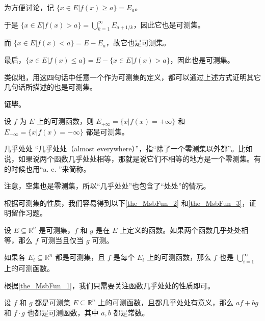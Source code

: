 为方便讨论，记 $\{x\in E|f(x)\geq a\}=E_a$。

于是 $\{x\in E|f(x)>a\}=\bigcup_{k=1}^\infty E_{a+1/k}$，因此它也是可测集。

而 $\{x\in E|f(x)<a\}=E-E_a$，故它也是可测集。

最后，$\{x\in E|f(x)\leq a\}=E-\{x\in E|f(x)>a\}$，因此也是可测集。

类似地，用这四句话中任意一个作为可测集的定义，都可以通过上述方式证明其它几句话所描述的也是可测集。

\textbf{证毕}。





\begin{corollary}{}
设 $f$ 为 $E$ 上的可测函数，则 $E_{+\infty}=\{x|f(x)=+\infty\}$ 和 $E_{-\infty}=\{x|f(x)=-\infty\}$ 都是可测集。
\end{corollary}



\begin{definition}{几乎处处}
“几乎处处（almost everywhere）”，指“除了一个零测集以外都”。比如说，如果说两个函数几乎处处相等，那就是说它们不相等的地方是一个零测集。有的时候也用“a. e. ”来简称。
\end{definition}

注意，空集也是零测集，所以“几乎处处”也包含了“处处”的情况。

根据可测集的性质，我们容易得到以下\autoref{the_MsbFun_2} 和\autoref{the_MsbFun_3}，证明留作习题。

\begin{theorem}{}\label{the_MsbFun_2}
设 $E\subseteq\mathbb{R}^n$ 是可测集，$f$ 和 $g$ 是在 $E$ 上定义的函数。如果两个函数几乎处处相等，那么 $f$ 可测当且仅当 $g$ 可测。
\end{theorem}



\begin{theorem}{}\label{the_MsbFun_3}
如果各 $E_i\subseteq\mathbb{R}^n$ 都是可测集，且 $f$ 是每个 $E_i$ 上的可测函数，那么 $f$ 也是 $\bigcup_{i=1}^\infty$ 上的可测函数。
\end{theorem}

根据\autoref{the_MsbFun_1}，我们只需要关注函数几乎处处的性质即可。

\begin{theorem}{}
设 $f$ 和 $g$ 都是可测集 $E\subseteq\mathbb{R}^n$ 上的可测函数，且都几乎处处有意义，那么 $af+bg$ 和 $f\cdot g$ 也都是可测函数，其中 $a, b$ 都是常数。
\end{theorem}

